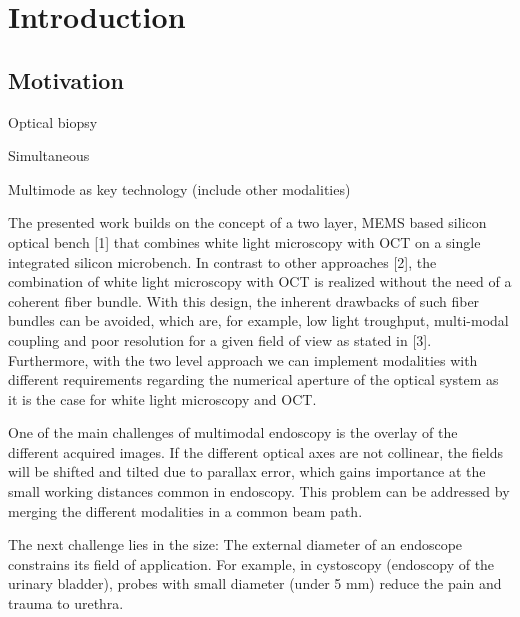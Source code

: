 %

\chapter{Introduction}
\label{Ch:Introduction}


\section{Motivation}



Optical biopsy

Simultaneous

Multimode as key technology (include other modalities)


The presented work builds on the concept of a two layer, MEMS based silicon optical bench [1] that combines white light microscopy with OCT on a single integrated silicon microbench. In contrast to other approaches [2], the combination of white light microscopy with OCT is realized without the need of a coherent fiber bundle. With this design, the inherent drawbacks of such fiber bundles can be avoided, which are, for example, low
light troughput, multi-modal coupling and poor resolution for a given field of view as stated in [3]. Furthermore, with the two level approach we can implement modalities with different requirements regarding the numerical aperture of the optical system as it is the case for white light microscopy and OCT.



One of the main challenges of multimodal endoscopy is the overlay of the different acquired images. If the different optical axes are not collinear, the fields will be shifted and tilted due to parallax error, which gains importance at the small working distances common in endoscopy. 
This problem can be addressed by merging the different modalities in a common beam path.

The next challenge lies in the size: The external diameter of an endoscope constrains its field of application. For example, in cystoscopy (endoscopy of the urinary bladder), probes with small diameter (under 5 mm) reduce the pain and trauma to urethra.

